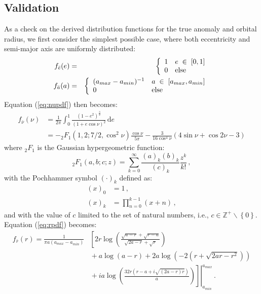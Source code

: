 \subsection{Validation}
As a check on the derived distribution functions for the true anomaly and orbital radius, we first consider the simplest possible case, where both eccentricity and semi-major axis are uniformly distributed:
\begin{eqnarray}
f_{\bar e}(e) &=& \left\{
    \begin{array}{l l}
   1 & e \; \in \; [0, 1] \\
    0 & \mathrm{else}
    \end{array}
    \right. \label{eq:euniformpdf}\\
f_{\bar a}(a) &=& \left\{
    \begin{array}{l l}
    (a_{max} - a_{min})^{-1} &a \; \in \; [a_{max}, a_{min}] \\
    0 & \mathrm{else}
    \end{array}
        \right. \label{eq:auniformpdf}
\end{eqnarray}
Equation (\ref{eq:nupdf}) then becomes:
\begin{align} \label{eq:nupdfuniform}
f_{\bar{\nu}}(\nu) &=  \frac{1}{2\pi} \int_{0}^{1} \frac{\left(1-e^2\right)^\frac{3}{2}}{\left(1+e\cos\nu\right)^2}\, \mathrm{d}e  \nonumber \\
&= -{}_2F_1(1,2;7/2,\cos^2\nu)\frac{\cos\nu}{5\pi} - \frac{3}{16 \cos^4\nu}\left(4\sin\nu + \cos 2\nu - 3\right)
\end{align}
where ${}_2F_1$ is the Gaussian hypergeometric function:
\begin{equation}\label{eq:gaussHyper}
{}_2F_1(a,b;c;z) = \sum_{k=0}^\infty \frac{(a)_k (b)_k}{(c)_k} \frac{z^k}{k!} \,,
\end{equation}
with the Pochhammer symbol $(\cdot)_k$ defined as:
\begin{align}
(x)_0 &= 1 \,,\\
(x)_k &= \prod_{n=0}^{k-1} (x+n) \,,
\end{align}
and with the value of $c$ limited to the set of natural numbers, i.e., $ c \in  \mathbb{Z}^+ \backslash \left\{0\right\}$.  Equation (\ref{eq:rpdf}) becomes:
\begin{align}
f_{\bar{r}}(r) =\frac{1}{\pi a \left(a_{max} - a_{min}\right)} 
& \left[ 2 r \log\left(\frac{\sqrt{a - r} + \sqrt{r - a}}{\sqrt{2a - r} + \sqrt{r}}\right) \right. \nonumber\\
& {} + a\log\left(a - r\right)+ 2a\log\left(-2\left(r + \sqrt{2ar - r^2}\right)\right)  \label{eq:rpdfuniform}  \\
&  \left.\left.{} + ia\log\left(\frac{32r\left(r - a + i\sqrt{(2a - r)r}\right)}{a}\right) \right]\right|_{a_{min}}^{a_{max}} \nonumber \, .
\end{align}

